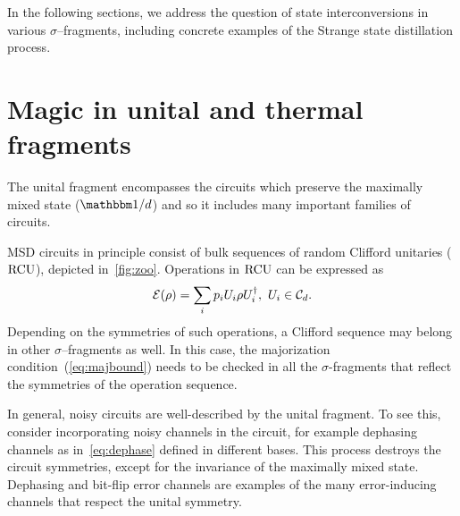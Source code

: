 \documentclass[pra,
aps,
twocolumn,
superscriptaddress,
groupedaddress,
nofootinbib,
reprint
]{revtex4-1}
\begin{document}
In the following sections, we address the question of state interconversions in various $\sigma$--fragments, including concrete examples of the Strange state distillation process. 

\section{Magic in unital and thermal fragments}\label{sec:unital}
The unital fragment encompasses the circuits which preserve the maximally mixed state ($\id/d$) and so it includes many important families of circuits.

MSD circuits in principle consist of bulk sequences of random Clifford unitaries (${\rm{RCU}}$), depicted in~\cref{fig:zoo}.
Operations in ${\rm{RCU}}$ can be expressed as
\begin{equation}
    \mathcal{E}(\rho) = \sum_i p_i U_i \rho U_i^\dagger,\ U_i \in \mathcal{C}_d.
\end{equation}
Depending on the symmetries of such operations, a Clifford sequence may belong in other $\sigma$--fragments as well.
In this case, the majorization condition~(\ref{eq:majbound}) needs to be checked in all the $\sigma$-fragments that reflect the symmetries of the operation sequence.

In general, noisy circuits are well-described by the unital fragment.
To see this, consider incorporating noisy channels in the circuit, for example dephasing channels as in~\cref{eq:dephase} defined in different bases.
This process destroys the circuit symmetries, except for the invariance of the maximally mixed state.
Dephasing and bit-flip error channels are examples of the many error-inducing channels that respect the unital symmetry. 
\end{document}
